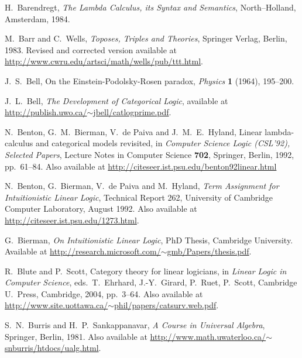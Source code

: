 \documentclass[12pt]{article}
\begin{document}
\begin{thebibliography}{99}
 H.\ Barendregt, {\sl The Lambda Calculus,
its Syntax and Semantics}, North--Holland, Amsterdam, 1984.

 M.\ Barr and C.\ Wells, {\sl Toposes, Triples and Theories},
Springer Verlag, Berlin, 1983.  Revised and corrected version available 
at \href{http://www.cwru.edu/artsci/math/wells/pub/ttt.html}{
http://www.cwru.edu/artsci/math/wells/pub/ttt.html}.

 J.\ S.\ Bell, On the Einstein-Podolsky-Rosen 
paradox, {\sl Physics} {\bf 1} (1964), 195--200.

 J.\ L.\ Bell, {\sl The Development of Categorical
Logic}, available at \hfill \break
\href{http://publish.uwo.ca/~jbell/catlogprime.pdf}{ http://publish.uwo.ca/$\sim$jbell/catlogprime.pdf}.

 N.\ Benton, G.\ M.\ Bierman, V.\ de Paiva and J.\ M.\ E.\
Hyland, Linear lambda-calculus and categorical models revisited, in
{\sl Computer Science Logic (CSL'92), Selected Papers}, Lecture
Notes in Computer Science {\bf 702}, Springer, Berlin, 1992, pp.\ 61--84.
Also available at
\href{http://citeseer.ist.psu.edu/benton92linear.html}
{http://citeseer.ist.psu.edu/benton92linear.html}

 N.\ Benton, G.\ Bierman, V.\ de Paiva and M.\ Hyland,
{\sl Term Assignment for Intuitionistic Linear Logic}, Technical Report 262, 
University of Cambridge Computer Laboratory, August 1992.
Also available at \href{http://citeseer.ist.psu.edu/1273.html}
{http://citeseer.ist.psu.edu/1273.html}.

 G.\ Bierman, {\sl On Intuitionistic Linear 
Logic}, PhD Thesis, Cambridge University.  Available at 
\href{http://research.microsoft.com/~gmb/Papers/thesis.pdf}
{http://research.microsoft.com/$\sim$gmb/Papers/thesis.pdf}.

 R.\ Blute and P.\ Scott, Category theory for linear
logicians, in {\sl Linear Logic in Computer Science}, eds.\
T.\ Ehrhard, J.-Y.\ Girard, P.\ Ruet, P.\ Scott, Cambridge U.\ Press, 
Cambridge, 2004, pp.\ 3--64.  Also available at
\href{http://www.site.uottawa.ca/~phil/papers/catsurv.web.pdf}
{http://www.site.uottawa.ca/$\sim$phil/papers/catsurv.web.pdf}.

\bibitem{BurrisS} S.\ N.\ Burris and H.\ P.\ Sankappanavar,
{\sl A Course in Universal Algebra}, Springer, Berlin, 1981.  Also 
available at \href{http://www.math.uwaterloo.ca/~snburris/htdocs/ualg.html}
{http://www.math.uwaterloo.ca/$\sim$snburris/htdocs/ualg.html}.


\end{thebibliography}
\end{document}
